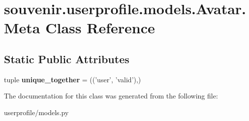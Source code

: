 \hypertarget{classsouvenir_1_1userprofile_1_1models_1_1Avatar_1_1Meta}{\section{souvenir.\-userprofile.\-models.\-Avatar.\-Meta Class Reference}
\label{classsouvenir_1_1userprofile_1_1models_1_1Avatar_1_1Meta}
}
\subsection*{Static Public Attributes}
\begin{DoxyCompactItemize}
\item 
\hypertarget{classsouvenir_1_1userprofile_1_1models_1_1Avatar_1_1Meta_a6ac7cd65338bebf16dab01c1233d5b79}{tuple {\bfseries unique\-\_\-together} = (('user', 'valid'),)}\label{classsouvenir_1_1userprofile_1_1models_1_1Avatar_1_1Meta_a6ac7cd65338bebf16dab01c1233d5b79}

\end{DoxyCompactItemize}


The documentation for this class was generated from the following file\-:\begin{DoxyCompactItemize}
\item 
userprofile/models.\-py\end{DoxyCompactItemize}
